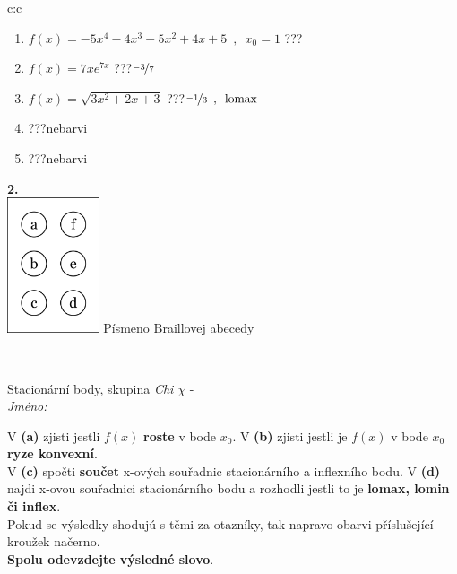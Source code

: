 \documentclass[10pt]{report}
\begin{document}
\begin{tabular}{c:c}
\begin{minipage}[c][104.5mm][t]{0.5\linewidth}
\begin{center}
\begin{minipage}{0.79\linewidth}
\begin{center}
\begin{varwidth}{\linewidth}
\begin{enumerate}
\item $f(x)=-5x^4-4x^3-5x^2+4x+5\enspace , \enspace x_0=1$\quad \dotfill\; ???\;\dotfill \quad {}
\item $f(x)=7xe^{7x}$\quad \dotfill\; ???\;\dotfill \quad $\nicefrac{-3}{7}$
\item $f(x)=\sqrt{3x^2+2x+3}$\quad \dotfill\; ???\;\dotfill \quad $\nicefrac{-1}{3}\enspace , \enspace\mathrm{lomax}$
\item \quad \dotfill\; ???\;\dotfill \quad nebarvi
\item \quad \dotfill\; ???\;\dotfill \quad nebarvi
\end{enumerate}
\end{varwidth}
\end{center}
\end{minipage}
\begin{minipage}{0.20\linewidth}
\begin{center}
{\Huge\bfseries 2.} \\[2mm]
\includegraphics[height=40mm]{../images/braille.png}
{\small Písmeno Braillovej abecedy}
\end{center}
\end{minipage}
\end{center}
\end{minipage}
\\ \hdashline
\begin{minipage}[c][104.5mm][t]{0.5\linewidth}
\begin{center}
\vspace{7mm}
{\huge Stacionární body, skupina \textit{Chi $\chi$} -}\\[5mm]
\textit{Jméno:}\phantom{xxxxxxxxxxxxxxxxxxxxxxxxxxxxxxxxxxxxxxxxxxxxxxxxxxxxxxxxxxxxxxxxx}\\[5mm]
\begin{minipage}{0.95\linewidth}
\begin{center}
{\small V \textbf{(a)} zjisti jestli $f(x)$ \textbf{roste} v bode $x_0$. V \textbf{(b)} zjisti jestli je $f(x)$ v bode $x_0$ \textbf{ryze konvexní}.\\V \textbf{(c)} spočti \textbf{součet} x-ových souřadnic stacionárního a inflexního bodu. V \textbf{(d)} najdi x-ovou souřadnici stacionárního bodu a rozhodli jestli to je \textbf{lomax, lomin či inflex}.\\Pokud se výsledky shodujú s těmi za otazníky, tak napravo obarvi příslušející kroužek načerno.\\\textbf{Spolu odevzdejte výsledné slovo}}.

\end{center}
\end{minipage}
\end{center}
\end{minipage}
\end{tabular}
\end{document}
